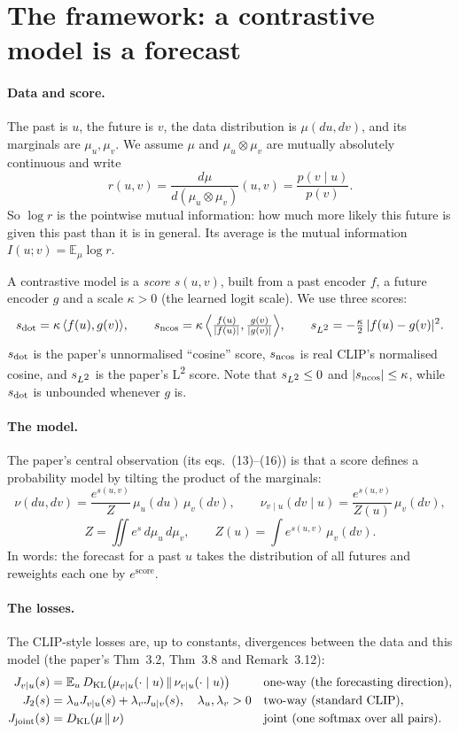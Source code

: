 \documentclass[11pt]{article}
\newcommand{\Ltwo}{L\textsuperscript{2}}
\newcommand{\KL}{D_{\mathrm{KL}}}
\newcommand{\E}{\mathbb{E}}
\newcommand{\vu}{{v\mid u}}
\newcommand{\uv}{{u\mid v}}
\theoremstyle{plain}
\theoremstyle{definition}
\theoremstyle{remark}
\begin{document}
\section{The framework: a contrastive model is a forecast}\label{sec:paper}

\paragraph{Data and score.} The past is $u$, the future is $v$, the data distribution is
$\mu(du,dv)$, and its marginals are $\mu_u,\mu_v$. We assume $\mu$ and $\mu_u\otimes\mu_v$ are
mutually absolutely continuous and write
\[
  r(u,v) = \frac{d\mu}{d(\mu_u\otimes\mu_v)}(u,v) = \frac{p(v\mid u)}{p(v)} .
\]
So $\log r$ is the pointwise mutual information: how much more likely this future is
given this past than it is in general. Its average is the mutual information
$I(u;v)=\E_\mu\log r$.

A contrastive model is a \emph{score} $s(u,v)$, built from a past encoder $f$, a future
encoder $g$ and a scale $\kappa>0$ (the learned logit scale). We use three scores:
\[
  s_{\rm dot} = \kappa\,\langle f(u),g(v)\rangle,\qquad
  s_{\rm ncos} = \kappa\,\Big\langle \tfrac{f(u)}{|f(u)|},\tfrac{g(v)}{|g(v)|}\Big\rangle,\qquad
  s_{\Ltwo} = -\tfrac{\kappa}{2}\,|f(u)-g(v)|^2 .
\]
$s_{\rm dot}$ is the paper's unnormalised ``cosine'' score, $s_{\rm ncos}$ is real CLIP's
normalised cosine, and $s_{\Ltwo}$ is the paper's \Ltwo{} score. Note that $s_{\Ltwo}\le 0$
and $|s_{\rm ncos}|\le\kappa$, while $s_{\rm dot}$ is unbounded whenever $g$ is.

\paragraph{The model.} The paper's central observation (its eqs.~(13)--(16)) is that a
score defines a probability model by tilting the product of the marginals:
\[
  \nu(du,dv) = \frac{e^{s(u,v)}}{Z}\,\mu_u(du)\,\mu_v(dv),\qquad
  \nu_\vu(dv\mid u) = \frac{e^{s(u,v)}}{Z(u)}\,\mu_v(dv),
\]
\[
  Z = \iint e^{s}\,d\mu_u\,d\mu_v,\qquad Z(u) = \int e^{s(u,v)}\,\mu_v(dv).
\]
In words: the forecast for a past $u$ takes the distribution of all futures and reweights
each one by $e^{\text{score}}$.

\paragraph{The losses.} The CLIP-style losses are, up to constants, divergences between the
data and this model (the paper's Thm~3.2, Thm~3.8 and Remark~3.12):
\begin{align*}
  J_\vu(s)   &= \E_{u}\,\KL\big(\mu_\vu(\cdot\mid u)\,\|\,\nu_\vu(\cdot\mid u)\big)
               && \text{one-way (the forecasting direction)},\\
  J_{2}(s)   &= \lambda_u J_\vu(s) + \lambda_v J_\uv(s),\quad \lambda_u,\lambda_v>0
               && \text{two-way (standard CLIP)},\\
  J_{\rm joint}(s) &= \KL(\mu\,\|\,\nu)
               && \text{joint (one softmax over all pairs)}.
\end{align*}
\end{document}
